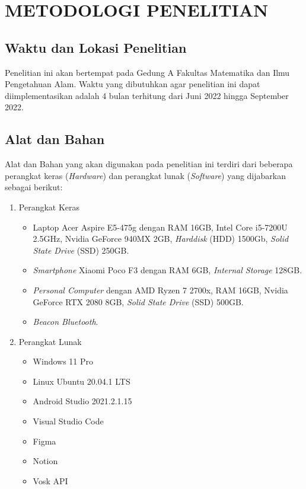 \fancyhf{} 
\fancyfoot[C]{\thepage}
\chapter{METODOLOGI PENELITIAN}

\section{Waktu dan Lokasi Penelitian}
Penelitian ini akan bertempat pada Gedung A Fakultas Matematika dan Ilmu Pengetahuan Alam. Waktu yang dibutuhkan agar penelitian ini dapat diimplementasikan adalah 4 bulan terhitung dari Juni 2022 hingga September 2022.

\section{Alat dan Bahan}
Alat dan Bahan yang akan digunakan pada penelitian ini terdiri dari beberapa perangkat keras (\textit{Hardware}) dan perangkat lunak (\textit{Software}) yang dijabarkan sebagai berikut:

\begin{enumerate}
\item Perangkat Keras
	\begin{itemize}
	\item Laptop Acer Aspire E5-475g dengan RAM 16GB, Intel Core i5-7200U 2.5GHz, Nvidia GeForce 940MX 2GB, \textit{Harddisk} (HDD) 1500Gb, \textit{Solid State Drive} (SSD) 250GB.
	\item \textit{Smartphone} Xiaomi Poco F3 dengan RAM 6GB, \textit{Internal Storage} 128GB.
	\item \textit{Personal Computer} dengan AMD Ryzen 7 2700x, RAM 16GB, Nvidia GeForce RTX 2080 8GB, \textit{Solid State Drive} (SSD) 500GB.
	\item \textit{Beacon Bluetooth}.
	\end{itemize}

\item Perangkat Lunak
	\begin{itemize}
	\item Windows 11 Pro
	\item Linux Ubuntu 20.04.1 LTS
	\item Android Studio 2021.2.1.15
	\item Visual Studio Code
	\item Figma
	\item Notion
	\item Vosk API
	
	\end{itemize}
\end{enumerate}

